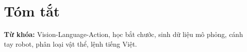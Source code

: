 \section*{Tóm tắt}

\noindent\textbf{Từ khóa:} Vision-Language-Action, học bắt chước, sinh dữ liệu mô phỏng, cánh tay robot, phân loại vật thể, lệnh tiếng Việt.
